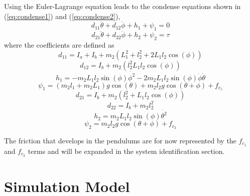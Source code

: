 Using the Euler-Lagrange equation leads to the condense equations shown in (\ref{eq:condense1}) and (\ref{eq:condense2}),
\begin{equation} \label{eq:condense1}
d_{11}\ddot{\theta}+d_{12}\ddot{\phi} + h_{1} + \psi_{1} = 0
\end{equation}
\begin{equation} \label{eq:condense2}
d_{21}\ddot{\theta} + d_{22}\ddot{\phi} + h_{2} + \psi_{2} = \tau
\end{equation}
where the coefficients are defined as
\begin{equation} \label{eq:d11}
d_{11} = I_{a} + I_{b} + m_{2}(L_{1}^2 + l_{2}^2+2L_{1}l_{2}\cos(\phi))
\end{equation}
\begin{equation} \label{eq:d12}
d_{12} = I_{b} +m_{2}(l_{2}^2 L_{1}l_{2}\cos(\phi))
\end{equation}
\begin{equation} \label{eq:h1}
h_{1} = -m_{2}L_{1}l_{2}\sin(\phi)\dot{\phi^2}-2m_{2}L_{1}l_{2}\sin(\phi)\dot{\phi}\dot{\theta}
\end{equation}
\begin{equation} \label{eq:psi1}
\psi_{1} = (m_{2}l_{1}+m_{2}L_{1})g\cos(\theta) + m_{2}l_{2}g\cos(\theta+\phi) + f_{c_{1}}
\end{equation}
\begin{equation} \label{eq:d21}
d_{21}= I_{b}+m_{2}(l_{2}^2+L_{1}l_{2}\cos(\phi))
\end{equation}
\begin{equation} \label{eq:d22}
d_{22}= I_{b}+ m_{2}l_{2}^2
\end{equation}
\begin{equation} \label{eq:h2}
h_{2}= m_{2}L_{1}l_{2}\sin(\phi)\dot{\theta^2}
\end{equation}
\begin{equation} \label{eq:psi2}
\psi_{2}= m_{2}l_{2}g\cos(\theta+\phi) + f_{c_{2}}
\end{equation}

The friction that develops in the pendulums are for now represented by the $f_{c_{1}}$ and $f_{c_{2}}$ terms and will be expanded in the system identification section.

\section{Simulation Model}
\label{sec:simulation_model}

